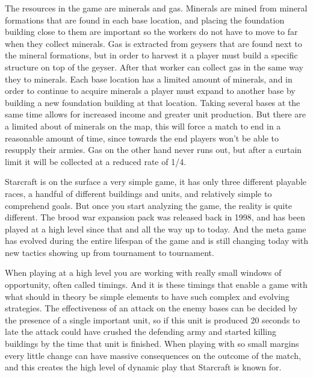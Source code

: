 The resources in the game are minerals and gas. Minerals are mined from mineral formations that are found in each base location, and placing the foundation building close to them are important so the workers do not have to move to far when they collect minerals. Gas is extracted from geysers that are found next to the mineral formations, but in order to harvest it a player must build a specific structure on top of the geyser. After that worker can collect gas in the same way they to minerals. Each base location has a limited amount of minerals, and in order to continue to acquire minerals a player must expand to another base by building a new foundation building at that location. Taking several bases at the same time allows for increased income and greater unit production. But there are a limited about of minerals on the map, this will force a match to end in a reasonable amount of time, since towards the end players won't be able to resupply their armies. Gas on the other hand never runs out, but after a curtain limit it will be collected at a reduced rate of 1/4. 

Starcraft is on the surface a very simple game, it has only three different playable races, a
handful of different buildings and units, and relatively simple to comprehend
goals. But once you start analyzing the game, the reality is quite different. The brood war expansion pack was released back in 1998, and has been played at a high level since that and all the way up to today. And the meta game has evolved during the entire lifespan of the game and is still changing today with new tactics showing up from tournament to tournament.
\cite{blizzardstarcraft}

When playing at a high level you are working with really small windows of opportunity, often called timings. And it is these timings that enable a game with what should in theory be simple elements to have such complex and evolving strategies. The effectiveness of an attack on the enemy bases can be decided by the presence of a single important unit, so if this unit is produced 20 seconds to late the attack could have crushed the defending army and started killing buildings by the time that unit is finished. When playing with so small margins every little change can have massive consequences on the outcome of the match, and this creates the high level of dynamic play that Starcraft is known for. 

